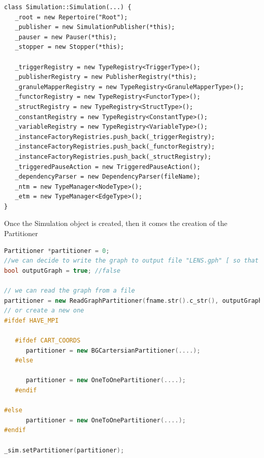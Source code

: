 \begin{verbatim}
class Simulation::Simulation(...) {
   _root = new Repertoire("Root");                                                                            
   _publisher = new SimulationPublisher(*this);                                                               
   _pauser = new Pauser(*this);                                                                               
   _stopper = new Stopper(*this);                                                                             
 
   _triggerRegistry = new TypeRegistry<TriggerType>();                                                        
   _publisherRegistry = new PublisherRegistry(*this);                                                         
   _granuleMapperRegistry = new TypeRegistry<GranuleMapperType>();                                                      
   _functorRegistry = new TypeRegistry<FunctorType>();                                                        
   _structRegistry = new TypeRegistry<StructType>();                                                          
   _constantRegistry = new TypeRegistry<ConstantType>();                                                      
   _variableRegistry = new TypeRegistry<VariableType>();                                                      
   _instanceFactoryRegistries.push_back(_triggerRegistry);                                                    
   _instanceFactoryRegistries.push_back(_functorRegistry);                                                    
   _instanceFactoryRegistries.push_back(_structRegistry);                                                     
   _triggeredPauseAction = new TriggeredPauseAction();                                                        
   _dependencyParser = new DependencyParser(fileName);                                                        
   _ntm = new TypeManager<NodeType>();                                                                        
   _etm = new TypeManager<EdgeType>();                                           
}
\end{verbatim}


Once the Simulation object is created, then it comes the creation of the Partitioner

\begin{lstlisting}[language=C++]
Partitioner *partitioner = 0;
//we can decide to write the graph to output file "LENS.gph" [ so that we can read back later?]
bool outputGraph = true; //false

// we can read the graph from a file
partitioner = new ReadGraphPartitioner(fname.str().c_str(), outputGraph);
// or create a new one
#ifdef HAVE_MPI 
   
   #ifdef CART_COORDS
      partitioner = new BGCartersianPartitioner(....);
   #else
   
      partitioner = new OneToOnePartitioner(....);
   #endif

#else
      partitioner = new OneToOnePartitioner(....);
#endif

_sim.setPartitioner(partitioner);

\end{lstlisting}

